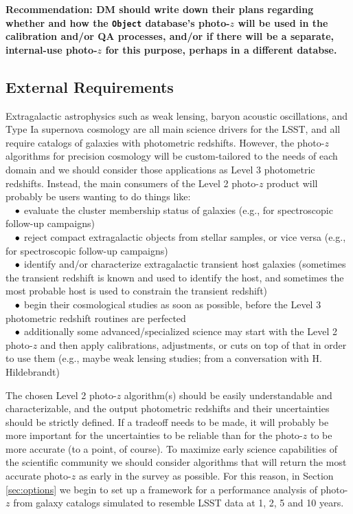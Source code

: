 \documentclass[DM,lsstdraft,toc]{lsstdoc}
\begin{document}
\textbf{Recommendation: DM should write down their plans regarding whether and how the {\tt Object} database's photo-$z$ will be used in the calibration and/or QA processes, and/or if there will be a separate, internal-use photo-$z$ for this purpose, perhaps in a different databse.}

\subsection{External Requirements}\label{ssec:motivation_external}

Extragalactic astrophysics such as weak lensing, baryon acoustic oscillations, and Type Ia supernova cosmology are all main science drivers for the LSST, and all require catalogs of galaxies with photometric redshifts. However, the photo-$z$ algorithms for precision cosmology will be custom-tailored to the needs of each domain and we should consider those applications as Level 3 photometric redshifts. Instead, the main consumers of the Level 2 photo-$z$ product will probably be users wanting to do things like: \\
${\rm \ \ \ }\bullet$ evaluate the cluster membership status of galaxies (e.g., for spectroscopic follow-up campaigns)\\
${\rm \ \ \ }\bullet$ reject compact extragalactic objects from stellar samples, or vice versa (e.g., for spectroscopic follow-up campaigns) \\
${\rm \ \ \ }\bullet$ identify and/or characterize extragalactic transient host galaxies (sometimes the transient redshift is known and used to identify the host, and sometimes the most probable host is used to constrain the transient redshift) \\
${\rm \ \ \ }\bullet$ begin their cosmological studies as soon as possible, before the Level 3 photometric redshift routines are perfected \\
${\rm \ \ \ }\bullet$ additionally some advanced/specialized science may start with the Level 2 photo-$z$ and then apply calibrations, adjustments, or cuts on top of that in order to use them (e.g., maybe weak lensing studies; from a conversation with H. Hildebrandt) 

\smallskip
The chosen Level 2 photo-$z$ algorithm(s) should be easily understandable and characterizable, and the output photometric redshifts and their uncertainties should be strictly defined. If a tradeoff needs to be made, it will probably be more important for the uncertainties to be reliable than for the photo-$z$ to be more accurate (to a point, of course). To maximize early science capabilities of the scientific community we should consider algorithms that will return the most accurate photo-$z$ as early in the survey as possible. For this reason, in Section \ref{sec:options} we begin to set up a framework for a performance analysis of photo-$z$ from galaxy catalogs simulated to resemble LSST data at 1, 2, 5 and 10 years.
\end{document}
